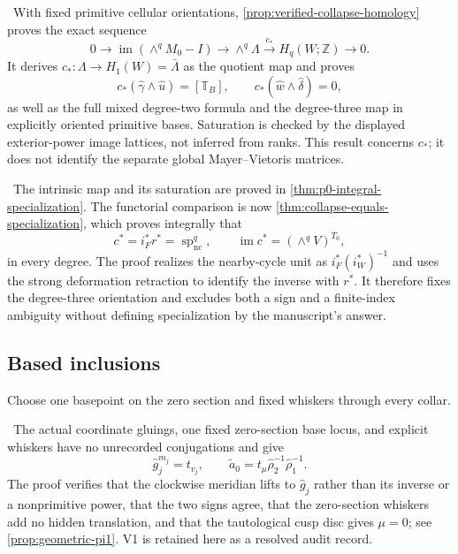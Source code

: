 \begin{auditrecord}
\Verified\ With fixed primitive cellular orientations,
\cref{prop:verified-collapse-homology} proves the exact sequence
\[
0\longrightarrow
\operatorname{im}(\wedge^qM_0-I)
\longrightarrow\wedge^q\Lambda
\xrightarrow{c_*}H_q(W;\mathbb Z)
\longrightarrow0.
\]
It derives $c_*\colon\Lambda\to H_1(W)=\bar\Lambda$ as the quotient map and
proves
\[
c_*(\widehat\gamma\wedge\widehat u)=[\mathbb T_B],
\qquad
c_*(\widehat w\wedge\widehat\delta)=0,
\]
as well as the full mixed degree-two formula and the degree-three map in
explicitly oriented primitive bases.  Saturation is checked by the displayed
exterior-power image lattices, not inferred from ranks.  This result concerns
$c_*$; it does not identify the separate global Mayer--Vietoris matrices.
\end{auditrecord}

\begin{auditrecord}
\Verified\ The intrinsic map and its saturation are proved in
\cref{thm:p0-integral-specialization}.  The functorial comparison is now
\cref{thm:collapse-equals-specialization}, which proves integrally that
\[
c^*=i_F^*r^*=\operatorname{sp}_{\mathrm{nc}}^q,
\qquad
\operatorname{im}c^*=(\wedge^qV)^{T_0},
\]
in every degree.  The proof realizes the nearby-cycle unit as
$i_F^*(i_W^*)^{-1}$ and uses the strong deformation retraction to identify the
inverse with $r^*$.  It therefore fixes the degree-three orientation and
excludes both a sign and a finite-index ambiguity without defining
specialization by the manuscript's answer.
\end{auditrecord}

\subsection{Based inclusions}

Choose one basepoint on the zero section and fixed whiskers through every collar.

\begin{auditrecord}
\Verified\ The actual coordinate gluings, one fixed zero-section base locus,
and explicit whiskers have no unrecorded conjugations and give
\[
\widehat g_j^{m_j}=t_{v_j},
\qquad
\widetilde a_0=t_\mu\widehat\rho_2^{-1}\widehat\rho_1^{-1}.
\]
The proof verifies that the clockwise meridian lifts to
$\widehat g_j$ rather than its inverse or a nonprimitive power, that the two
signs agree, that the zero-section whiskers add no hidden translation, and
that the tautological cusp disc gives $\mu=0$; see
\cref{prop:geometric-pi1}.  V1 is retained here as a resolved audit record.
\end{auditrecord}

